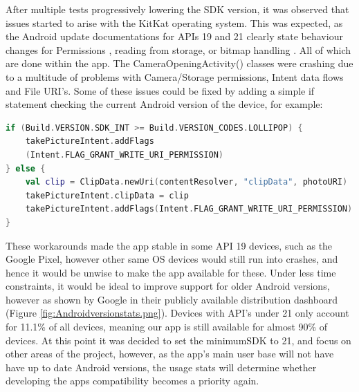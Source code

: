 \par After multiple tests progressively lowering the SDK version, it was observed that issues started to arise with the KitKat operating system. This was expected, as the Android update documentations for APIs 19 and 21 clearly state behaviour changes for Permissions \cite{androiddevelopers}, reading from storage, or bitmap handling \cite{androiddevelopers2} . All of which are done within the app. The CameraOpeningActivity() classes were crashing due to a multitude of problems with Camera/Storage permissions, Intent data flows and File URI's. Some of these issues could be fixed by adding a simple if statement checking the current Android version of the device, for example:
\begin{lstlisting}[caption={Checking the Android Build Version}, label={lst:checkAndroidVersion}, language=Kotlin]
if (Build.VERSION.SDK_INT >= Build.VERSION_CODES.LOLLIPOP) {
    takePictureIntent.addFlags
    (Intent.FLAG_GRANT_WRITE_URI_PERMISSION)
} else {
    val clip = ClipData.newUri(contentResolver, "clipData", photoURI)
    takePictureIntent.clipData = clip
    takePictureIntent.addFlags(Intent.FLAG_GRANT_WRITE_URI_PERMISSION)
}
\end{lstlisting}
These workarounds made the app stable in some API 19 devices, such as the Google Pixel, however other same OS devices would still run into crashes, and hence it would be unwise to make the app available for these. Under less time constraints, it would be ideal to improve support for older Android versions, however as shown by Google in their publicly available distribution dashboard (Figure \ref{fig:Androidversionstats.png}). Devices with API's under 21 only account for 11.1\% of all devices, meaning our app is still available for almost 90\% of devices. At this point it was decided to set the minimumSDK to 21, and focus on other areas of the project, however, as the app's main user base will not have have up to date Android versions, the usage stats will determine whether developing the apps compatibility becomes a priority again.
